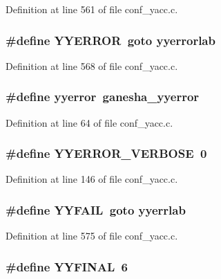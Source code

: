 Definition at line 561 of file conf\_\-yacc.c.
\subsubsection[{YYERROR}]{\setlength{\rightskip}{0pt plus 5cm}\#define YYERROR~goto yyerrorlab}\label{conf__yacc_8c_f1eef6197be78122699013d0784acc80}




Definition at line 568 of file conf\_\-yacc.c.
\subsubsection[{yyerror}]{\setlength{\rightskip}{0pt plus 5cm}\#define yyerror~ganesha\_\-yyerror}\label{conf__yacc_8c_fd2adb2274e61b81cf475d1ebea69d50}




Definition at line 64 of file conf\_\-yacc.c.
\subsubsection[{YYERROR\_\-VERBOSE}]{\setlength{\rightskip}{0pt plus 5cm}\#define YYERROR\_\-VERBOSE~0}\label{conf__yacc_8c_0943f558a560b9b5fa0593d7e36496c1}




Definition at line 146 of file conf\_\-yacc.c.
\subsubsection[{YYFAIL}]{\setlength{\rightskip}{0pt plus 5cm}\#define YYFAIL~goto yyerrlab}\label{conf__yacc_8c_383d9671b1abd97e4c6f3708d1ca32f3}




Definition at line 575 of file conf\_\-yacc.c.
\subsubsection[{YYFINAL}]{\setlength{\rightskip}{0pt plus 5cm}\#define YYFINAL~6}\label{conf__yacc_8c_6419f3fd69ecb6b7e063410fd4e73b2f}





